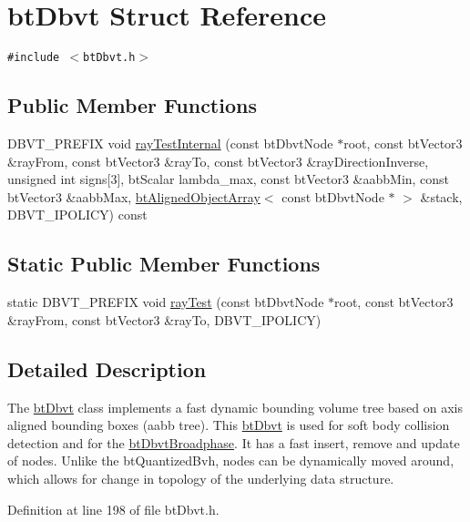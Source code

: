 \hypertarget{structbt_dbvt}{
\section{btDbvt Struct Reference}
\label{structbt_dbvt}
}
{\tt \#include $<$btDbvt.h$>$}

\subsection*{Public Member Functions}
\begin{CompactItemize}
\item 
DBVT\_\-PREFIX void \hyperlink{structbt_dbvt_f8f2ca01be7eadc4732464272f580028}{rayTestInternal} (const btDbvtNode $\ast$root, const btVector3 \&rayFrom, const btVector3 \&rayTo, const btVector3 \&rayDirectionInverse, unsigned int signs\mbox{[}3\mbox{]}, btScalar lambda\_\-max, const btVector3 \&aabbMin, const btVector3 \&aabbMax, \hyperlink{classbt_aligned_object_array}{btAlignedObjectArray}$<$ const btDbvtNode $\ast$ $>$ \&stack, DBVT\_\-IPOLICY) const 
\end{CompactItemize}
\subsection*{Static Public Member Functions}
\begin{CompactItemize}
\item 
static DBVT\_\-PREFIX void \hyperlink{structbt_dbvt_8e316ee3bc9bd7b7354086c0c558cfb5}{rayTest} (const btDbvtNode $\ast$root, const btVector3 \&rayFrom, const btVector3 \&rayTo, DBVT\_\-IPOLICY)
\end{CompactItemize}


\subsection{Detailed Description}
The \hyperlink{structbt_dbvt}{btDbvt} class implements a fast dynamic bounding volume tree based on axis aligned bounding boxes (aabb tree). This \hyperlink{structbt_dbvt}{btDbvt} is used for soft body collision detection and for the \hyperlink{structbt_dbvt_broadphase}{btDbvtBroadphase}. It has a fast insert, remove and update of nodes. Unlike the btQuantizedBvh, nodes can be dynamically moved around, which allows for change in topology of the underlying data structure. 

Definition at line 198 of file btDbvt.h.

